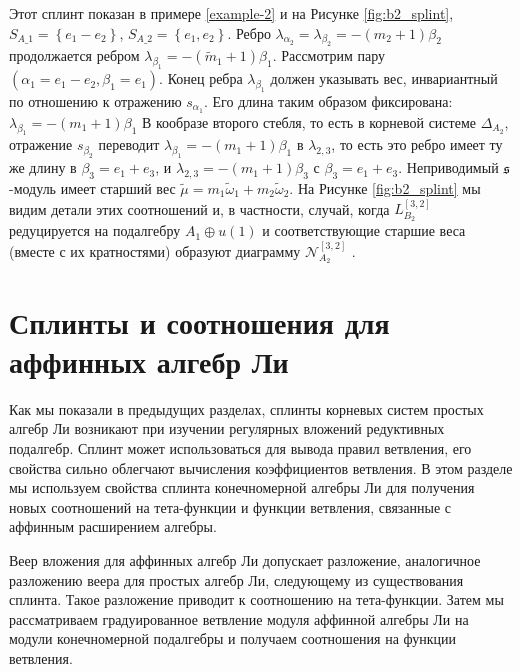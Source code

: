 \begin{itemize}
Этот сплинт показан в примере \ref{example-2} и на Рисунке \ref{fig:b2_splint}, 
$S_{A\_1}=\left\{ e_{1}-e_{2}\right\} $, $S_{A\_2}=\left\{e_{1},e_{2}\right\} $. Ребро $\lambda _{\alpha _{2}}=\lambda_{\beta _{2}}=-\left( m_{2}+1\right) \beta _{2}$ продолжается ребром $\lambda _{\beta _{1}}=-\left( \widetilde{m}_{1}+1\right) \beta_{1}$. Рассмотрим пару $\left(\alpha_{1}=e_{1}-e_{2},\beta _{1}=e_{1}\right)$. Конец ребра $\lambda _{\beta _{1}}$ должен указывать вес, инвариантный по отношению к отражению  $s_{\alpha _{1}}$. Его длина таким образом фиксирована: $\lambda _{\beta _{1}}=-\left( m_{1}+1\right) \beta _{1}$ В кообразе второго стебля, то есть в корневой системе $\Delta_{A_{2}}$, отражение $s_{\beta _{2}}$ переводит $\lambda _{\beta _{1}}=-\left(m_{1}+1\right) \beta_{1}$ в $\lambda _{2,3}$, то есть это ребро имеет ту же длину в $\beta _{3}=e_{1}+e_{3}$, и $\lambda _{2,3}=-\left(m_{1}+1\right)\beta _{3}$ с $\beta_{3}=e_{1}+e_{3}$. Неприводимый  $\mathfrak{s}$-модуль имеет старший вес $\widetilde{\mu }=m_{1}\widetilde{\omega }_{1}+m_{2}\widetilde{\omega }_{2}$. На Рисунке \ref{fig:b2_splint} мы видим детали этих соотношений и, в частности, случай, когда $L_{B_{2}}^{\left[ 3,2\right] }$ редуцируется на подалгебру $A_{1}\oplus u\left( 1\right) $ и соответствующие старшие веса (вместе с их кратностями) образуют диаграмму $\mathcal{N}_{A_2}^{\left[ 3,2\right] }$ .
\end{itemize}

\section{Сплинты и соотношения для аффинных алгебр Ли}
\label{sec:splints-affine}

Как мы показали в предыдущих разделах, сплинты корневых систем простых алгебр Ли возникают при изучении регулярных вложений редуктивных подалгебр. Сплинт может использоваться для вывода правил ветвления, его свойства сильно облегчают вычисления коэффициентов ветвления. В этом разделе мы используем свойства сплинта конечномерной алгебры Ли для получения новых соотношений на тета-функции и функции ветвления, связанные с аффинным расширением алгебры. 

Веер вложения для аффинных алгебр Ли допускает разложение, аналогичное разложению веера для простых алгебр Ли, следующему из существования сплинта. Такое разложение приводит к соотношению на тета-функции. Затем мы рассматриваем градуированное ветвление модуля аффинной алгебры Ли на модули конечномерной подалгебры и получаем соотношения на функции ветвления.

